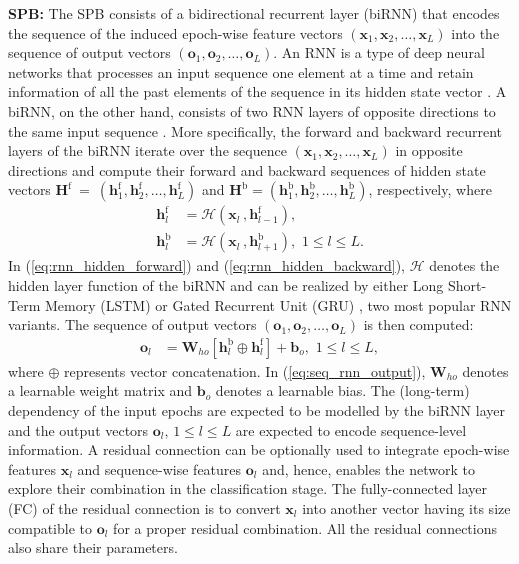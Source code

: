 \documentclass[journal,twoside,web]{ieeecolor}
\begin{document}
{\bf SPB:} The SPB consists of a bidirectional recurrent layer (biRNN) that encodes the sequence of the induced epoch-wise feature vectors $(\mathbf{x}_1, \mathbf{x}_2, \ldots, \mathbf{x}_L)$ into the sequence of output vectors $(\mathbf{o}_1, \mathbf{o}_2, \ldots, \mathbf{o}_L)$. An RNN is a type of deep neural networks that processes an input sequence one element at a time and retain information of all the past elements of the sequence in its hidden state vector \cite{LeCun2015}. A biRNN, on the other hand, consists of two RNN layers of opposite directions to the same input sequence \cite{Schuster1997}. More specifically, the forward and backward recurrent layers of the biRNN iterate over the sequence $(\mathbf{x}_1, \mathbf{x}_2, \ldots, \mathbf{x}_L)$ in opposite directions and compute their forward and backward sequences of hidden state vectors $\mathbf{H}^{\text{f}}~=~(\mathbf{h}^{\text{f}}_1, \mathbf{h}^{\text{f}}_2, \ldots, \mathbf{h}^{\text{f}}_L)$ and $\mathbf{H}^{\text{b}}=(\mathbf{h}^{\text{b}}_1, \mathbf{h}^{\text{b}}_2, \ldots, \mathbf{h}^{\text{b}}_L)$, respectively, where
\begin{align}
\mathbf{h}^{\text{f}}_l &= \mathcal{H}(\mathbf{x}_l\,, \mathbf{h}^{\text{f}}_{l-1}), \label{eq:rnn_hidden_forward} \\
\mathbf{h}^{\text{b}}_l &= \mathcal{H}(\mathbf{x}_l\,, \mathbf{h}^{\text{b}}_{l+1}), \mbox{~} 1 \le l \le L.
\label{eq:rnn_hidden_backward}
\end{align}
In (\ref{eq:rnn_hidden_forward}) and (\ref{eq:rnn_hidden_backward}),  $\mathcal{H}$ denotes the hidden layer function of the biRNN and can be realized by either Long Short-Term Memory (LSTM) \cite{Hochreiter1997} or Gated Recurrent Unit (GRU) \cite{Cho2014}, two most popular RNN variants. The sequence of output vectors $(\mathbf{o}_1, \mathbf{o}_2, \ldots, \mathbf{o}_L)$ is then computed:
\begin{align}
\mathbf{o}_l &= \mathbf{W}_{ho}[\mathbf{h}^{\text{b}}_l \oplus \mathbf{h}^{\text{f}}_l] + \mathbf{b}_{o}, \mbox{~} 1 \le l \le L,
\label{eq:seq_rnn_output}
\end{align}
where $\oplus$ represents vector concatenation. In (\ref{eq:seq_rnn_output}), $\mathbf{W}_{ho}$ denotes a learnable weight matrix and $\mathbf{b}_{o}$ denotes a learnable bias. The (long-term) dependency of the input epochs are expected to be modelled by the biRNN layer and the output vectors $\mathbf{o}_l$, $1 \le l \le L$ are expected to encode sequence-level information. A residual connection can be optionally used to integrate epoch-wise features $\mathbf{x}_l$ and sequence-wise features $\mathbf{o}_l$ and, hence, enables the network to explore their combination in the classification stage. The fully-connected layer (FC) of the residual connection is to convert $\mathbf{x}_l$ into another vector having its size compatible to $\mathbf{o}_l$ for a proper residual combination. All the residual connections also share their parameters. 
\end{document}
